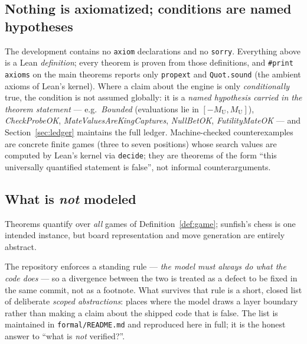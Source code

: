 \documentclass[11pt]{article}
\newcommand{\MU}{M_{\mathrm{U}}}    %
\theoremstyle{plain}
\theoremstyle{definition}
\theoremstyle{remark}
\begin{document}
\subsection{Nothing is axiomatized; conditions are named hypotheses}
\label{sec:model-axioms}

The development contains no \texttt{axiom} declarations and no
\texttt{sorry}.  Everything above is a Lean \emph{definition}; every
theorem is proven from those definitions, and \texttt{\#print axioms}
on the main theorems reports only \texttt{propext} and
\texttt{Quot.sound} (the ambient axioms of Lean's kernel).  Where a
claim about the engine is only \emph{conditionally} true, the condition
is not assumed globally: it is a \emph{named hypothesis carried in the
theorem statement} --- e.g.\ \emph{Bounded} (evaluations lie in
$[-\MU,\MU]$), \emph{CheckProbeOK}, \emph{MateValuesAreKingCaptures},
\emph{NullBetOK}, \emph{FutilityMateOK} --- and
Section~\ref{sec:ledger} maintains the full ledger.  Machine-checked
counterexamples are concrete finite games (three to seven positions)
whose search values are computed by Lean's kernel via \texttt{decide};
they are theorems of the form ``this universally quantified statement is
false'', not informal counterarguments.

\subsection{What is \emph{not} modeled}
\label{sec:model-not}

Theorems quantify over \emph{all} games of
Definition~\ref{def:game}; sunfish's chess is one intended instance, but
board representation and move generation are entirely abstract.

The repository enforces a standing rule --- \emph{the model must always
do what the code does} --- so a divergence between the two is treated
as a defect to be fixed in the same commit, not as a footnote.  What
survives that rule is a short, closed list of deliberate \emph{scoped
abstractions}: places where the model draws a layer boundary rather
than making a claim about the shipped code that is false.  The list is
maintained in \texttt{formal/README.md} and reproduced here in full;
it is the honest answer to ``what is \emph{not} verified?''.
\end{document}
